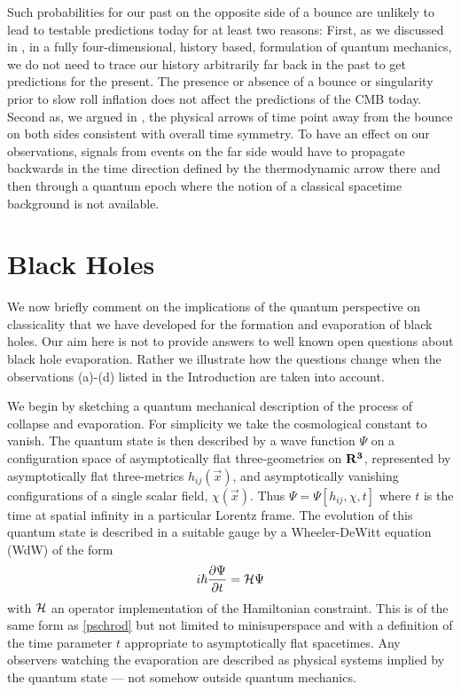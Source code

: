 \documentclass[prd,floats,superscriptaddress,eqsecnum,floatfix,nofootinbib,12pt]{revtex4}
\def\vx{{\vec x}}
\def\vx{{\vec x}}
\def\hij{h_{ij}}
\def\be{\begin{equation}}
\def\ee{\end{equation}}
\def\jf{}
\def\tf{}
\begin{document}
{{{{Such probabilities for our past on the opposite side of a bounce are unlikely to lead to testable predictions today 
for at least two reasons:  First, as we discussed in \cite{HHH08a}, in a fully four-dimensional, history based,  formulation of quantum mechanics, we do not need to trace our history arbitrarily far back in the past to get predictions for the present. The presence or absence of a bounce or singularity prior to slow roll inflation does not affect the predictions of the CMB today. Second as, we argued in \cite{HH11a}, the physical arrows of time point away from the bounce on both sides consistent with overall time symmetry. To have an effect on our observations, signals from events on the far side would have to propagate backwards in the time direction defined by the thermodynamic arrow there and then through a quantum epoch {where the notion of a classical spacetime background is not available.} 


\section{Black Holes}
\label{blackholes}

We now briefly comment on the implications of the quantum perspective on classicality that we have developed for the formation and evaporation of black holes. Our aim here is not to provide answers to well known open questions about black hole evaporation. Rather we illustrate how the questions change when the observations (a)-(d) listed in the Introduction are taken into account. 

We begin by sketching a quantum mechanical description of the process of collapse and evaporation. For simplicity we take the cosmological constant to vanish. The quantum state is then described by a wave function $\Psi$ on a configuration space of asymptotically flat three-geometries on $\bf R^3$, represented by {\jf asymptotically flat}  three-metrics $h_{ij}(\vx)$, and asymptotically vanishing configurations of a single scalar field, $\chi(\vx)$. Thus $\Psi=\Psi[\hij,\chi,t]$ where $t$ is the time at spatial infinity in a particular Lorentz frame.  The evolution of this quantum state is described {\tf in a suitable gauge} by a Wheeler-DeWitt equation (WdW) of the form
\be
i\hbar\frac{\partial \Psi}{\partial t} = {\cal H} \Psi
\label{WdW}
\ee
with $\cal H$ an operator implementation of the Hamiltonian constraint. This is of the same form as \eqref{pschrod} but not limited to minisuperspace and with a definition of the time parameter $t$ appropriate to asymptotically flat spacetimes. Any observers watching {\jf the evaporation} are described as physical systems implied by the quantum state --- not somehow outside quantum mechanics. 

}}}}
\end{document}
